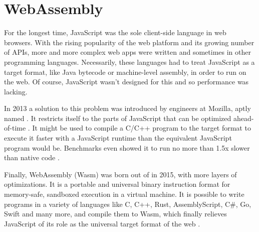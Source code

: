 \section{WebAssembly}


For the longest time, JavaScript was the sole client-side language in web browsers. With the rising popularity of the web platform and its growing number of APIs, more and more complex web apps were written and sometimes in other programming languages. Necessarily, these languages had to treat JavaScript as a target format, like Java bytecode or machine-level assembly, in order to run on the web. Of course, JavaScript wasn't designed for this and so performance was lacking.

In 2013 a solution to this problem was introduced by engineers at Mozilla, aptly named . It restricts itself to the parts of JavaScript that can be optimized ahead-of-time \cite{Herman2014}. It might be used to compile a C/C++ program to the  target format to execute it faster with a JavaScript runtime than the equivalent JavaScript program would be. Benchmarks even showed it to run no more than 1.5x slower than native code \cite{Zakai2013}.

Finally, WebAssembly (Wasm) was born out of  in 2015, with more layers of optimizations. It is a portable and universal binary instruction format for memory-safe, sandboxed execution in a virtual machine.
It is possible to write programs in a variety of languages like C, C++, Rust, AssemblyScript, C\#, Go, Swift and many more, and compile them to Wasm, which finally relieves JavaScript of its role as the universal target format of the web \cite{W3C2020}.



